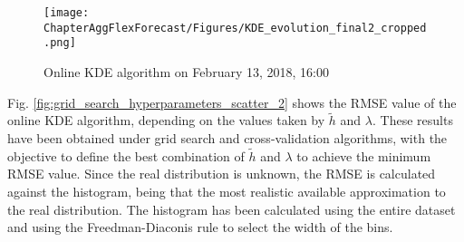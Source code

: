\begin{figure}[!ht]
\centerline{\texttt{[image: ChapterAggFlexForecast/Figures/KDE\_evolution\_final2\_cropped.png]}}
\caption{Online KDE algorithm on February 13, 2018, 16:00}
\label{fig:KDE_EVOLUTION1}
\end{figure}

Fig. \ref{fig:grid_search_hyperparameters_scatter_2} shows the RMSE value of the online KDE algorithm, depending on the values taken by $\widetilde{h}$ and $\lambda$. These results have been obtained under grid search and cross-validation algorithms, with the objective to define the best combination of $\widetilde{h}$ and $\lambda$ to achieve the minimum RMSE value. 
Since the real distribution is unknown, the RMSE is calculated against the histogram, being that the most realistic available approximation to the real distribution. The histogram has been calculated using the entire dataset and using the Freedman-Diaconis rule to select the width of the bins.

%


